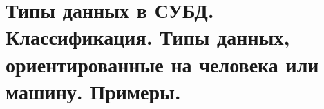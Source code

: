 {
	\section{Типы данных в СУБД. Классификация. Типы данных, ориентированные на человека или машину. Примеры.}
	\newpage
}

